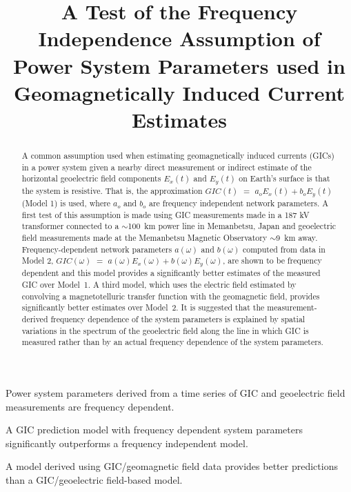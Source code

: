 \documentclass[draft,linenumbers]{agujournal2018}
\begin{document}

\title{A Test of the Frequency Independence Assumption of Power System Parameters used in Geomagnetically Induced Current Estimates}





\begin{keypoints}
\item Power system parameters derived from a time series of GIC and geoelectric field measurements are frequency dependent.
\item A GIC prediction model with frequency dependent system parameters significantly outperforms a frequency independent model.
\item A model derived using GIC/geomagnetic field data provides better predictions than a GIC/geoelectric field-based model.
\end{keypoints}

\begin{abstract}
A common assumption used when estimating geomagnetically induced currents (GICs) in a power system given a nearby direct measurement or indirect estimate of the horizontal geoelectric field components $E_x(t)$ and $E_y(t)$ on Earth's surface is that the system is resistive. That is, the approximation $GIC(t)$  $=$ $a_oE_x(t) + b_oE_y(t)$ (Model 1) is used, where $a_o$ and $b_o$ are frequency independent network parameters.  A first test of this assumption is made using GIC measurements made in a 187 kV transformer connected to a $\sim$100~km power line in Memanbetsu, Japan and geoelectric field measurements made at the Memanbetsu Magnetic Observatory $\sim$9~km away.  Frequency-dependent network parameters $a(\omega)$ and $b(\omega)$ computed from data in Model 2, $GIC(\omega)$ $=$ $a(\omega)E_x(\omega) + b(\omega)E_y(\omega)$,  are shown to be frequency dependent and this model provides a significantly better estimates of the measured GIC over Model~1. A third model, which uses the electric field estimated by convolving a magnetotelluric transfer function with the geomagnetic field, provides significantly better estimates over Model~2. It is suggested that the measurement-derived frequency dependence of the system parameters is explained by spatial variations in the spectrum of the geoelectric field along the line in which GIC is measured rather than by an actual frequency dependence of the system parameters.
\end{abstract}
\end{document}
